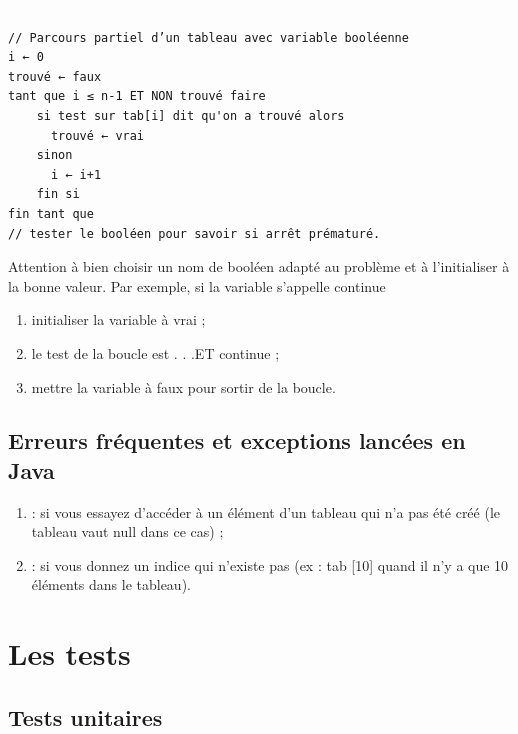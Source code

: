 \documentclass[11pt,a4paper]{article}
\begin{document}
					\textcolor{white}{.} \par
				
            \par
        \begin{verbatim}
// Parcours partiel d’un tableau avec variable booléenne
i ← 0
trouvé ← faux
tant que i ≤ n-1 ET NON trouvé faire
    si test sur tab[i] dit qu'on a trouvé alors
      trouvé ← vrai
    sinon
      i ← i+1
    fin si
fin tant que
// tester le booléen pour savoir si arrêt prématuré.
      \end{verbatim}
        Attention \`a bien choisir un nom de bool\'een adapt\'e au probl\`eme et \`a l'initialiser \`a la bonne
        valeur. Par exemple, si la variable s'appelle \guillemotleft  continue \guillemotright 
        
					\begin{enumerate}
				
			\item initialiser la variable \`a vrai ;
			\item le test de la boucle est \guillemotleft  . . .ET continue \guillemotright  ;
			\item mettre la variable \`a faux pour sortir de la boucle.
					\end{enumerate}
				
            \par
        \subsection{Erreurs fr\'equentes et exceptions lanc\'ees en Java}
					\begin{enumerate}
				
			\item \verb@NullPointerException@ : 
            si vous essayez d'acc\'eder \`a un \'el\'ement d'un tableau qui n'a pas \'et\'e cr\'e\'e
            (le tableau vaut null dans ce cas) ;
          
			\item \verb@ArrayIndexOutOfBoundsException@ : 
            si vous donnez un indice qui n'existe pas (ex : tab [10] quand il n'y a que 10 \'el\'ements dans le tableau).
          
					\end{enumerate}
				
            \par
        \section{Les tests}\subsection{Tests unitaires}
			
\end{document}
